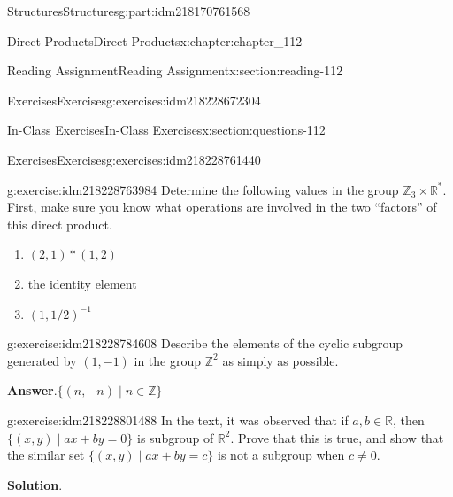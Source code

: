 \documentclass[oneside,10pt,]{book}
\newcommand{\blocktitlefont}{\relax}
\numberwithin{equation}{section}
\begin{document}
\begin{partptx}{Structures}{}{Structures}{}{}{g:part:idm218170761568}
\begin{chapterptx}{Direct Products}{}{Direct Products}{}{}{x:chapter:chapter_112}
\begin{sectionptx}{Reading Assignment}{}{Reading Assignment}{}{}{x:section:reading-112}
\begin{exercises-subsection-numberless}{Exercises}{}{Exercises}{}{}{g:exercises:idm218228672304}
\par\medskip\noindent
\end{exercises-subsection-numberless}
\end{sectionptx}
%
%
\typeout{************************************************}
\typeout{************************************************}
%
\begin{sectionptx}{In-Class Exercises}{}{In-Class Exercises}{}{}{x:section:questions-112}
%
%
%
\typeout{************************************************}
\typeout{************************************************}
%
\begin{exercises-subsection-numberless}{Exercises}{}{Exercises}{}{}{g:exercises:idm218228761440}
\par\medskip\noindent%
%
\begin{exercisegroup}
\begin{divisionexerciseeg}{1}{}{}{g:exercise:idm218228763984}%
Determine the following values in the group \(\mathbb{Z}_3 \times  \mathbb{R}^*\).  First, make sure you know what operations are involved in the two ``factors'' of this direct product.%
\begin{enumerate}[label=(\alph*)]
\item{}\(\displaystyle (2,1)* (1,2)\)%
\item{}the identity element%
\item{}\(\displaystyle (1, 1/2)^{-1}\)%
\end{enumerate}
%
\end{divisionexerciseeg}%
\begin{divisionexerciseeg}{2}{}{}{g:exercise:idm218228784608}%
Describe the elements of the cyclic subgroup generated by \((1,-1)\) in the group \(\mathbb{Z}^2\) as simply as possible.%
\par\smallskip%
\noindent\textbf{\blocktitlefont Answer}.\hypertarget{g:answer:idm218228797888}{}\quad{}\(\{(n,-n)\mid n \in \mathbb{Z}\}\)%
\end{divisionexerciseeg}%
\begin{divisionexerciseeg}{3}{}{}{g:exercise:idm218228801488}%
In the text, it was observed that if \(a, b \in  \mathbb{R}\),  then \(\{(x, y) \mid a x + b y = 0\}\) is subgroup of \(\mathbb{R}^2\).  Prove that this is true, and show that the similar set  \(\{(x, y) \mid a x + b y = c\}\) is not a subgroup when \(c \neq 0\).%
\par\smallskip%
\noindent\textbf{\blocktitlefont Solution}.\hypertarget{g:solution:idm218228826304}{}\quad{}%

\end{divisionexerciseeg}
\end{exercisegroup}
\end{exercises-subsection-numberless}
\end{sectionptx}
\end{chapterptx}
\end{partptx}
\end{document}

